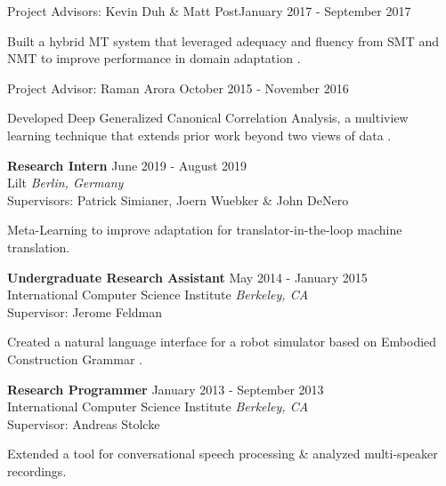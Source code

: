 \documentclass[margin,line,hyperref,color]{res}
\newenvironment{packed_itemize}{
\begin{itemize}[leftmargin=1.5em]
  \setlength{\itemsep}{0pt}
  \setlength{\parskip}{0pt}
  \setlength{\parsep}{0pt}
}{\end{itemize}}
\begin{document}
\begin{resume}
Project Advisors:  Kevin Duh \&  Matt Post\hfill  January 2017 - September 2017
\begin{packed_itemize}
\item Built a hybrid MT system that leveraged adequacy and fluency from SMT and NMT to improve performance in domain adaptation \citep{Khayrallah+2017IJCAI}. 
\end{packed_itemize}

Project Advisor:  Raman Arora \hfill  October 2015 - November 2016
\begin{packed_itemize}
\item Developed Deep Generalized Canonical Correlation Analysis, a multiview learning technique that extends prior work beyond two views of data \citep{Benton+2019NAACL}.
\end{packed_itemize}


\textbf{Research Intern} \hfill  June 2019 - August 2019 \\
Lilt  \hfill \textit{Berlin, Germany}\\
Supervisors: Patrick Simianer, Joern Wuebker \& John DeNero
\begin{packed_itemize}
\item Meta-Learning to improve adaptation for translator-in-the-loop machine translation.
\end{packed_itemize}


\textbf{Undergraduate Research Assistant} \hfill  May 2014 - January 2015\\
International Computer Science Institute    \hfill \textit{Berkeley, CA}\\
Supervisor:  Jerome Feldman
\begin{packed_itemize}
\item Created a natural language interface for a robot simulator based on Embodied Construction Grammar \citep{khayrallah+2015HRI}. 
\end{packed_itemize}


\textbf{Research Programmer} \hfill  January 2013 - September 2013\\
International Computer Science Institute    \hfill \textit{Berkeley, CA}\\
Supervisor: Andreas Stolcke
\begin{packed_itemize}
\item Extended a tool for conversational speech processing \& analyzed multi-speaker recordings.
\end{packed_itemize}




\end{resume}
\end{document}
